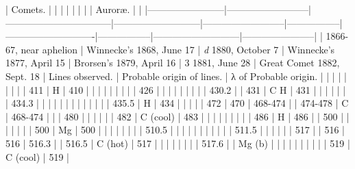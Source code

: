 \documentclass[a4paper, 12pt, oneside, polutonikogreek, english]{article}
\begin{document}
| Comets.        |             |                 |              |             |         |              |         | Auroræ.          |            |
|------------------------|--------------------------|---------------------------------|---------------------------|--------------------------|-----------------|----------------------------|-----------------|---------------------------|-----------------------|
| 1866-67, near aphelion | Winnecke's 1868, June 17 | \emph{d} 1880, October 7       | Winnecke's 1877, April 15 | Brorsen's 1879, April 16 | 3 1881, June 28 | Great Comet 1882, Sept. 18 | Lines observed. | Probable origin of lines. | λ of Probable origin. |
|            |             |                 |              |             |         |              | 411       | H             | 410          |
|            |             |                 |              |             |         |              | 426       |              |            |
|            |             |                 |              |             | 430.2      |              | 431       | C H            | 431          |
|            |             |                 |              |             | 434.3      |              |         |              |            |
|            |             |                 |              |             |         |              | 435.5      | H             | 434          |
|            |             |                 | 472            | 470           | 468-474     |              | 474-478     | C             | 468-474        |
|            | 480           |                 |              |             |         |              | 482       | C (cool)         | 483          |
|            |             |                 |              |             |         |              | 486       | H             | 486          |
| 500          |             |                 |              |             |         |              | 500       | Mg            | 500          |
|            |             |                 |              |             |         | 510.5           |         |              |            |
|            |             |                 |              |             |         | 511.5           |         |              |            |
|            | 517           |                 | 516            | 516           | 516.3      |              | 516.5      | C (hot)          | 517          |
|            |             |                 |              |             |         | 517.6           |         | Mg (b)          |            |
|            |             |                 |              |             |         |              | 519       | C (cool)         | 519          |
\end{document}
